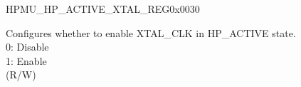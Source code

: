 \begin{register}{H}{PMU\_HP\_ACTIVE\_XTAL\_REG}{0x0030}\label{regdesc:PMUHPACTIVEXTALREG}
%
%
\regnewline%
\begin{regdesc}\begin{reglist}
\label{fielddesc:PMUHPACTIVEXPDXTAL}\item [PMU\_HP\_ACTIVE\_XPD\_XTAL] Configures whether to enable XTAL\_CLK in HP\_ACTIVE state.\\
0: Disable\\
1: Enable\\
(R/W)
\end{reglist}\end{regdesc}
\end{register}


